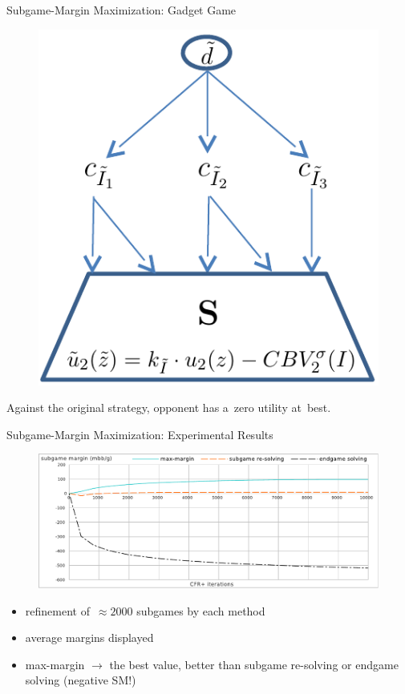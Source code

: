 \documentclass{beamer}
\theoremstyle{definition}
\begin{document}
  \begin{frame}{Subgame-Margin Maximization: Gadget Game}
    \begin{figure}
      \centering
      \includegraphics[width=.5\textwidth]{../img/max-margin-gadget.png}
    \end{figure}
    \pause

    Against the original strategy, opponent has a~zero utility at~best.
  \end{frame}

  \begin{frame}{Subgame-Margin Maximization: Experimental Results}
    \begin{figure}[H]
      \centering
      \includegraphics[width=\textwidth]{../img/sm-experiments}
    \end{figure}
    \pause

    \begin{itemize}[<+- | alert@+>]
      \item refinement of~$\approx 2000$ subgames by each method
      \item average margins displayed
      \item max-margin $\to$ the best value, better than subgame re-solving or endgame solving (negative SM!)
    \end{itemize}
  \end{frame}
\end{document}
